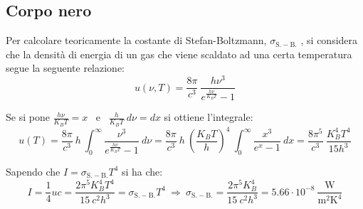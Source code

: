 \documentclass[12pt,twoside,a4]{article}
\begin{document}
\newpage
\renewcommand{\theindexsol}{$\Q$}
\subsection{Corpo nero}
\begin{solution}
	Per calcolare teoricamente la costante di Stefan-Boltzmann, $ \sigma_{\mathrm{S.-B.}}$ , si considera che la densità di energia di un gas che viene scaldato ad una certa temperatura segue la seguente relazione: \begin{equation*}
        u (\nu , T) = \frac{8 \pi}{c^3} \ \frac{h \nu^3}{e^{\frac{h \nu}{K_B T}}- 1}    
        \end{equation*}
        
        Se si pone $\frac{h \nu}{K_B T} = x $ \ e \ $\frac{h }{K_B T} \ d\nu = dx$ si ottiene l'integrale: \begin{equation*}
        u(T) = \frac{8 \pi}{c^3} \ h \ \int_{0}^{\infty} {\frac{\nu^3}{e^{\frac{h \nu}{K_B T}}- 1}} \ d\nu = \frac{8 \pi}{c^3} \ h \ \left( \frac{K_B T}{h}\right)^4 \ \int_{0}^{\infty} {\frac{x^3}{e^x - 1 }} \ dx = \frac{8 \pi^5}{c^3} \ \frac{K^4_B T^4}{15 h^3}  
        \end{equation*}
        
        \bigskip
        Sapendo che $I =  \sigma_{\mathrm{S.-B.}} T^4$ si ha che: \begin{equation*}
        I = \frac{1}{4} u c = \frac{2 \pi^5 K_B^4 T^4}{15 \ c^2 h^3 } =  \sigma_{\mathrm{S.-B.}} T^4  \  \Rightarrow  \    \sigma_{\mathrm{S.-B.}} = \frac{2 \pi^5 K_B^4 }{15 \ c^2 h^3 } = 5.66 \cdot 10^{-8} \ \frac{\mathrm{W}}{\mathrm{m}^2 \mathrm{K}^4} 
        \end{equation*}
\end{solution}
\end{document}
